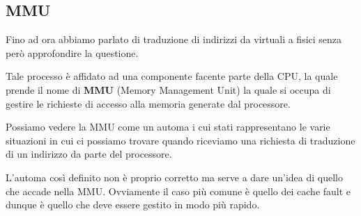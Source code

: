 \subsection{MMU}
Fino ad ora abbiamo parlato di traduzione di indirizzi da virtuali a fisici senza però approfondire
la questione.

Tale processo è affidato ad una componente facente parte della CPU, la quale prende il nome di
\textbf{MMU} (Memory Management Unit) la quale si occupa di gestire le richieste di accesso alla
memoria generate dal processore.

Possiamo vedere la MMU come un automa i cui stati rappresentano le varie situazioni in cui ci
possiamo trovare quando riceviamo una richiesta di traduzione di un indirizzo da parte del
processore.
\begin{center}
\end{center}
L'automa così definito non è proprio corretto ma serve a dare un'idea di quello che accade nella
MMU. Ovviamente il caso più comune è quello dei cache fault e dunque è quello che deve essere
gestito in modo più rapido.

